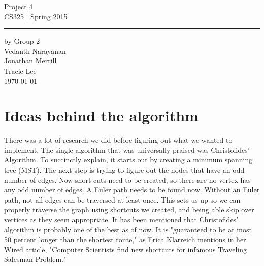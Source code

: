 \documentclass[11pt,letterpaper]{article}
\begin{document}
\begin{titlepage}
    \vspace*{4cm}
    \begin{flushright}
    {\huge
        Project 4\\[5mm]
    }
    {\large
        CS325 | Spring 2015
     }
    \end{flushright}
\hrule
    \begin{flushright}
	by Group 2\\
	Vedanth Narayanan\\
	Jonathan Merrill\\
	Tracie Lee\\
    \vfill
	\today\\
    \end{flushright}
\end{titlepage}

\raggedright

\section*{Ideas behind the algorithm}
There was a lot of research we did before figuring out what we wanted to implement. The single algorithm that was universally praised was Christofides' Algorithm. To succinctly explain, it starts out by creating a minimum spanning tree (MST). The next step is trying to figure out the nodes that have an odd number of edges. Now short cuts need to be created, so there are no vertex has any odd number of edges. A Euler path needs to be found now. Without an Euler path, not all edges can be traversed at least once. This sets us up so we can properly traverse the graph using shortcuts we created, and being able skip over vertices as they seem appropriate. It has been mentioned that Christofides' algorithm is probably one of the best as of now. It is "guaranteed to be at most 50 percent longer than the shortest route," as Erica Klarreich mentions in her Wired article, "Computer Scientists find new shortcuts for infamous Traveling Salesman Problem."\vspace{8pt}
\end{document}
